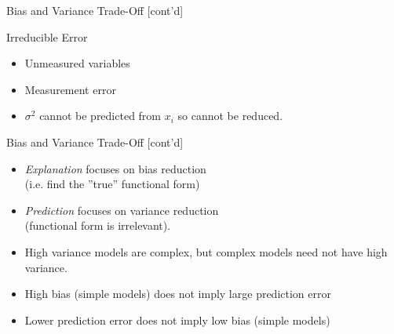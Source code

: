 \documentclass[ignorenonframetext,xcolor=x11names]{beamer}
\begin{document}
\begin{frame}{Bias and Variance Trade-Off \small [cont'd]}
\begin{block}{Irreducible Error}
  \begin{itemize}
     \item Unmeasured variables
     \item Measurement error
     \item $\sigma^2$ cannot be predicted from $x_i$ so cannot be reduced.
  \end{itemize}
\end{block}
\end{frame}

\begin{frame}{Bias and Variance Trade-Off \small [cont'd]}
\begin{itemize}
  \item \emph{Explanation} focuses on bias reduction \\(i.e. find the ''true'' functional form)
  \item \emph{Prediction} focuses on variance reduction \\(functional form is irrelevant).
  \item High variance models are complex, but complex models need not have high variance.
  \item High bias (simple models) does not imply large prediction error
  \item Lower prediction error does not imply low bias (simple models)
\end{itemize}
\end{frame}

\end{document}

